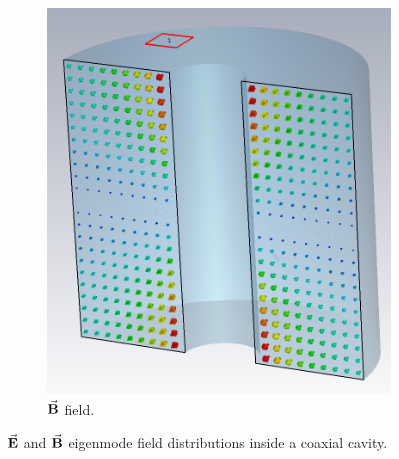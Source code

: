 \documentclass{article}
\begin{document}
\begin{figure}[H]
    \begin{subfigure}{0.45\textwidth}
        \centering
        \includegraphics[width=\linewidth]{../../../figures/cst/cavity_B_field_dist.png}
        \caption*{$\vec{\textbf{B}}$ field.}
    \end{subfigure}
    \caption{$\vec{\textbf{E}}$ and $\vec{\textbf{B}}$ eigenmode field distributions inside a coaxial cavity.}
    \label{fig:rhodo_cavity_field_dist}
\end{figure} \fi
\end{document}
